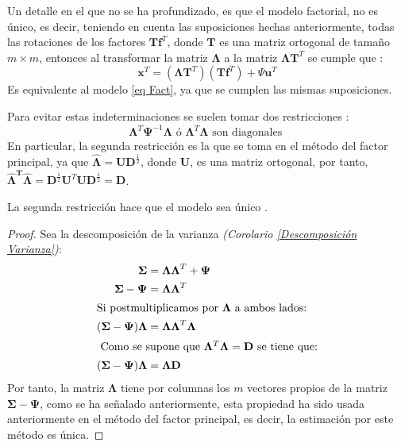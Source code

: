 \noindent Un detalle en el que no se ha profundizado, es que el modelo factorial, no es único, es decir, teniendo en cuenta las suposiciones hechas anteriormente, todas las rotaciones de los factores $\mathbf{Tf}^T$, donde $\mathbf{T}$ es una matriz ortogonal de tamaño $m\times m$, entonces al transformar la matriz $\mathbf{\Lambda}$ a la matriz $\mathbf{\Lambda T}^T$ se cumple que \cite{Mardia 1979}:
\begin{equation}
\mathbf{x}^T=(\mathbf{\Lambda T}^T)(\mathbf{Tf}^T)+\Psi\mathbf{u}^T
\end{equation}
\noindent Es equivalente al modelo \ref{eq Fact}, ya que se cumplen las mismas suposiciones. 

\noindent Para evitar estas indeterminaciones se suelen tomar dos restricciones \cite{Mardia 1979}:
\begin{equation}
\mathbf{\Lambda}^T \mathbf{\Psi}^{-1}\mathbf{\Lambda} \text{ ó } \mathbf{\Lambda}^T \mathbf{\Lambda} \text{ son diagonales }
\end{equation}
\noindent En particular, la segunda restricción es la que se toma en el método del factor principal, ya que $\mathbf{\hat{\Lambda}}=\mathbf{UD}^{\frac{1}{2}}$, donde $\mathbf{U}$, es una matriz ortogonal, por tanto, $\mathbf{\hat{\Lambda}^T \hat{\Lambda}}=\mathbf{D}^{\frac{1}{2}}\mathbf{U}^T\mathbf{U}\mathbf{D}^{\frac{1}{2}}=\mathbf{D}$. 

\begin{propo}
La segunda restricción hace que el modelo sea único \cite{Peña 2002}. 
\begin{proof}
Sea la descomposición de la varianza \emph{(Corolario \ref{Descomposición Varianza})}: \begin{align*}
\mathbf{\Sigma}&=\mathbf{\Lambda\Lambda}^T+\mathbf{\Psi}\\
\mathbf{\Sigma}-\mathbf{\Psi}&=\mathbf{\Lambda\Lambda}^T\\
\intertext{Si postmultiplicamos por $\mathbf{\Lambda}$ a ambos lados:}
(\mathbf{\Sigma}-\mathbf{\Psi})\mathbf{\Lambda}&=\mathbf{\Lambda\Lambda}^T \mathbf{\Lambda}\\
\intertext{ Como se supone que $\mathbf{\Lambda}^T \mathbf{\Lambda}=\mathbf{D}$ se tiene que:}
(\mathbf{\Sigma}-\mathbf{\Psi})\mathbf{\Lambda}&=\mathbf{\Lambda D}
\end{align*}
Por tanto, la matriz $\mathbf{\Lambda}$ tiene por columnas los $m$ vectores propios de la matriz $\mathbf{\Sigma-\Psi}$, como se ha señalado anteriormente, esta propiedad ha sido usada anteriormente en el método del factor principal, es decir, la estimación por este método es única. 
\end{proof}
\end{propo}
